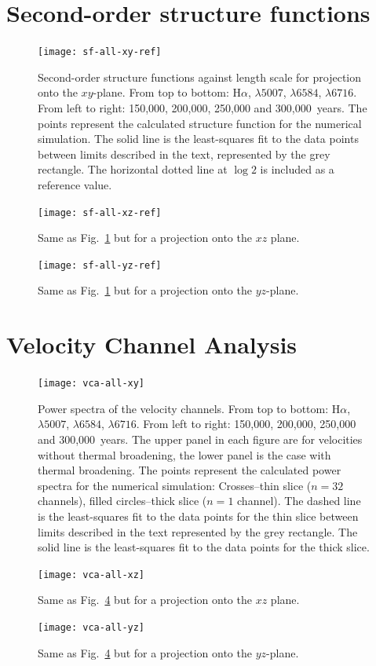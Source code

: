 \documentclass[useAMS,usenatbib]{mn2e}
\begin{document}
\appendix

\section[]{Second-order structure functions}
\begin{figure}
\centering
\texttt{[image: sf-all-xy-ref]}
\caption{Second-order structure functions against length scale for
  projection onto the
  $xy$-plane. From top to bottom:
  H$\alpha$, \oiii$\lambda 5007$, \nii$\lambda 6584$, \sii$\lambda
  6716$. From left to right: 150,000, 200,000, 250,000 and
  300,000~years. The points represent the calculated structure
  function for the numerical simulation. The solid line is the
  least-squares fit to the data points between limits described in the
text, represented by the grey rectangle. The horizontal dotted line at $\log 2$ is included as a
reference value.}
\label{fig:sfunc}
\end{figure}
 \begin{figure}
 \centering
 \texttt{[image: sf-all-xz-ref]}
 \caption{Same as Fig.~\protect\ref{fig:sfunc} but for a projection onto the $xz$ plane.}
 \label{fig:sfuncxz}
 \end{figure}
 \begin{figure}
 \centering
 \texttt{[image: sf-all-yz-ref]}
 \caption{Same as Fig.~\protect\ref{fig:sfunc} but for a projection onto the $yz$-plane.}
 \label{fig:sfuncyz}
 \end{figure}
\section[]{Velocity Channel Analysis}
\begin{figure}
\centering
\texttt{[image: vca-all-xy]}
\caption{Power spectra of the velocity channels. From top to bottom:
  H$\alpha$, \oiii$\lambda 5007$, \nii$\lambda 6584$, \sii$\lambda
  6716$. From left to right: 150,000, 200,000, 250,000 and
  300,000~years. The upper panel in each figure are for velocities
  without thermal broadening, the lower panel is the case with thermal
  broadening. The points represent the calculated power spectra for
  the numerical simulation: Crosses--thin slice ($n=32$ channels),
  filled circles--thick slice
  ($n=1$ channel). The dashed line is the
  least-squares fit to the data points for the thin slice between limits described in the
text represented by the grey rectangle. The solid line is the least-squares fit to
the data points for the thick slice.}
\label{fig:vca}
\end{figure}
 \begin{figure}
 \centering
 \texttt{[image: vca-all-xz]}
 \caption{Same as Fig.~\protect\ref{fig:vca} but for a projection onto the $xz$ plane.}
 \label{fig:vcaxz}
 \end{figure}
 \begin{figure}
 \centering
 \texttt{[image: vca-all-yz]}
 \caption{Same as Fig.~\protect\ref{fig:vca} but for a projection onto the $yz$-plane.}
 \label{fig:vcayz}
 \end{figure}


\label{lastpage}
\end{document}

